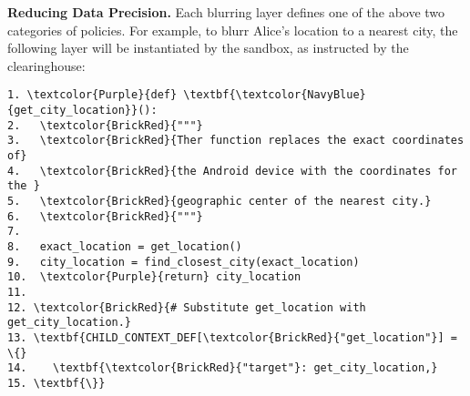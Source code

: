 
%
\textbf{Reducing Data Precision.}
Each blurring layer defines one of the above two categories of policies. 
For example, to blurr Alice's location to a nearest city, the following layer
will be instantiated by the sandbox, as instructed by the clearinghouse:

\begin{Verbatim}
1. \textcolor{Purple}{def} \textbf{\textcolor{NavyBlue}{get_city_location}}():
2.   \textcolor{BrickRed}{"""}
3.   \textcolor{BrickRed}{Ther function replaces the exact coordinates of} 
4.   \textcolor{BrickRed}{the Android device with the coordinates for the } 
5.   \textcolor{BrickRed}{geographic center of the nearest city.}
6.   \textcolor{BrickRed}{"""}
7.
8.   exact_location = get_location()
9.   city_location = find_closest_city(exact_location)
10.  \textcolor{Purple}{return} city_location
11.
12. \textcolor{BrickRed}{# Substitute get_location with get_city_location.}
13. \textbf{CHILD_CONTEXT_DEF[\textcolor{BrickRed}{"get_location"}] = \{}
14.    \textbf{\textcolor{BrickRed}{"target"}: get_city_location,}
15. \textbf{\}}
\end{Verbatim}

